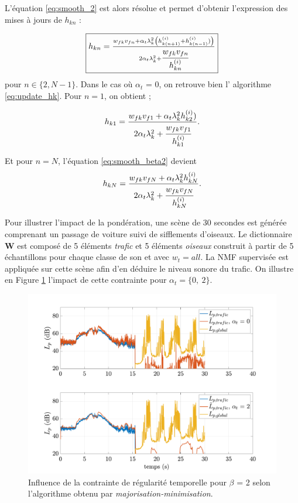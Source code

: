 L'équation \ref{eq:smooth_2} est alors résolue et permet d'obtenir l'expression des mises à jours de $h_{kn}$ : 

\begin{equation}\label{eq:smooth_beta2}
\fbox{$
h_{kn} = \frac{w_{fk} v_{fn}+\alpha_t  \lambda_k^2 \left(h_{k(n+1)}^{(i)}+h_{k(n-1)}^{(i)})\right)}{2\alpha_t \lambda_k^2 + \cfrac{w_{fk} v_{fn}} {h_{kn}^{(i)}}}$}
\end{equation}
pour $n \in \lbrace 2, N-1 \rbrace$. Dans le cas où $\alpha_t$ = 0, on retrouve bien l' algorithme \ref{eq:update_hk}. Pour $n = 1$, on obtient ; 

\begin{equation}
h_{k1} = \frac{w_{fk} v_{f1}+\alpha_t \lambda_k^2 h_{k2}^{(i)})}{2\alpha_t \lambda_k^2 + \cfrac{w_{fk} v_{f1}}{h_{k1}^{(i)}}}.
\end{equation}

Et pour $n = N$, l'équation \ref{eq:smooth_beta2} devient 
\begin{equation}
h_{kN} = \frac{w_{fk} v_{fN}+\alpha_t  \lambda_k^2 h_{kN}^{(i)}}{2\alpha_t \lambda_k^2 + \cfrac{w_{fk} v_{fN}} {h_{kN}^{(i)}}}.
\end{equation}

Pour illustrer l'impact de la pondération, une scène de 30 secondes est générée comprenant un passage de voiture suivi de sifflements d'oiseaux. Le dictionnaire $\mathbf{W}$ est composé de 5 éléments \textit{trafic} et 5 éléments \textit{oiseaux} construit à partir de 5 échantillons pour chaque classe de son et avec $w_t = all$. La NMF supervisée est appliquée sur cette scène afin d'en déduire le niveau sonore du trafic. On illustre en Figure \ref{fig:smooth_2} l'impact de cette contrainte pour $\alpha_t = \lbrace 0,~2\rbrace$. 

\begin{figure}[h]
\centering
\includegraphics[width=.9\linewidth]{./figures/NMF/LpSmooth_2.pdf}
\caption{Influence de la contrainte de régularité temporelle pour $\beta$ = 2 selon l'algorithme obtenu par \textit{majorisation-minimisation}.}
\label{fig:smooth_2}
\end{figure}


